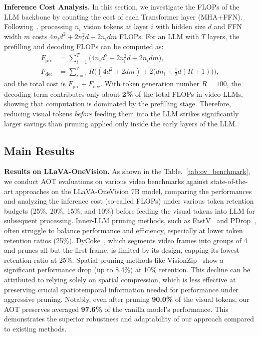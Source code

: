 \noindent \textbf{Inference Cost Analysis.}
\label{sec:inference_cost}
In this section, we investigate the FLOPs of the LLM backbone by counting the cost of each Transformer layer (MHA+FFN). Following~\cite{chen2024image,xing2024pyramiddrop,tao2025dycoke,shao2025holitom}, processing $n_i$ vision tokens at layer $i$ with hidden size $d$ and FFN width $m$ costs $4n_i d^2 + 2n_i^2 d + 2n_i d m$ FLOPs.
For an LLM with $T$ layers, the prefilling and decoding FLOPs can be computed as:
\begin{align}
    F_{\text{pre}}
    &= \sum_{i=1}^T \big(4n_i d^2 + 2n_i^2 d + 2n_i d m\big),\\
    F_{\text{dec}}
    &= \sum_{i=1}^T
    R\Big((4d^2 + 2d m) + 2\big(d n_i + \tfrac{1}{2}d(R+1)\big)\Big),
\end{align}
and the total cost is $F_{\text{pre}} + F_{\text{dec}}$.
With token generation number $R=100$, the decoding term contributes only about \textbf{2\%} of the total FLOPs in video LLMs, showing that computation is dominated by the prefilling stage. Therefore, reducing visual tokens \textit{before} feeding them into the LLM strikes significantly larger savings than pruning applied only inside the early layers of the LLM.



\subsection{Main Results}
\label{sec:main_results}

\noindent \textbf{Results on LLaVA-OneVision.} 
As shown in the Table.~\ref{tab:ov_benchmark}, we conduct AOT evaluations on various video benchmarks against state-of-the-art approaches on the LLaVA-OneVision 7B model, comparing the performances and analyzing the inference cost (so-called FLOPs) under various token retention budgets (25\%, 20\%, 15\%, and 10\%) before feeding the visual tokens into LLM for subsequent processing. Inner-LLM pruning methods, such as FastV~\cite{chen2024image} and PDrop~\cite{xing2024pyramiddrop}, often struggle to balance performance and efficiency, especially at lower token retention ratios (25\%). DyCoke~\cite{tao2025dycoke}, which segments video frames into groups of 4 and prunes all but the first frame, is limited by its design, capping its lowest retention ratio at 25\%. Spatial pruning methods like VisionZip~\cite{yang2025visionzip} show a significant performance drop (up to 8.4\%) at 10\% retention. This decline can be attributed to relying solely on spatial compression, which is less effective at preserving crucial spatiotemporal information needed for performance under aggressive pruning. Notably, even after
pruning \textbf{90.0\%} of the visual tokens, our AOT preserves averaged \textbf{97.6\%} of the vanilla model’s performance.
This demonstrates the superior robustness and adaptability of our approach compared to existing methods.



